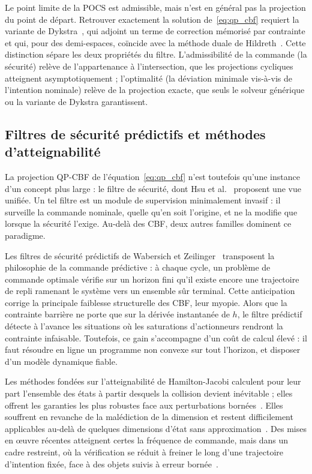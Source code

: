 Le point limite de la \ac{POCS} est admissible, mais n'est en général pas la projection du point de départ. Retrouver exactement la solution de~\eqref{eq:qp_cbf} requiert la variante de Dykstra~\cite{Dykstra1983Restricted,Boyle1986Method}, qui adjoint un terme de correction mémorisé par contrainte et qui, pour des demi-espaces, coïncide avec la méthode duale de Hildreth~\cite{Hildreth1957Quadratic}. Cette distinction sépare les deux propriétés du filtre. L'admissibilité de la commande (la sécurité) relève de l'appartenance à l'intersection, que les projections cycliques atteignent asymptotiquement ; l'optimalité (la déviation minimale vis-à-vis de l'intention nominale) relève de la projection exacte, que seuls le solveur générique ou la variante de Dykstra garantissent.

\subsection{Filtres de sécurité prédictifs et méthodes d'atteignabilité}\label{subsec:revue_filtres_securite}
La projection \ac{QP}-\ac{CBF} de l'équation~\eqref{eq:qp_cbf} n'est toutefois qu'une instance d'un concept plus large : le filtre de sécurité, dont Hsu et al.~\cite{Hsu2024Safety} proposent une vue unifiée. Un tel filtre est un module de supervision minimalement invasif : il surveille la commande nominale, quelle qu'en soit l'origine, et ne la modifie que lorsque la sécurité l'exige. Au-delà des \ac{CBF}, deux autres familles dominent ce paradigme.

Les filtres de sécurité prédictifs de Wabersich et Zeilinger~\cite{Wabersich2021Predictive} transposent la philosophie de la commande prédictive : à chaque cycle, un problème de commande optimale vérifie sur un horizon fini qu'il existe encore une trajectoire de repli ramenant le système vers un ensemble sûr terminal. Cette anticipation corrige la principale faiblesse structurelle des \ac{CBF}, leur myopie. Alors que la contrainte barrière ne porte que sur la dérivée instantanée de $h$, le filtre prédictif détecte à l'avance les situations où les saturations d'actionneurs rendront la contrainte infaisable. Toutefois, ce gain s'accompagne d'un coût de calcul élevé : il faut résoudre en ligne un programme non convexe sur tout l'horizon, et disposer d'un modèle dynamique fiable.

Les méthodes fondées sur l'atteignabilité de Hamilton-Jacobi calculent pour leur part l'ensemble des états à partir desquels la collision devient inévitable ; elles offrent les garanties les plus robustes face aux perturbations bornées~\cite{Wabersich2023Data}. Elles souffrent en revanche de la malédiction de la dimension et restent difficilement applicables au-delà de quelques dimensions d'état sans approximation~\cite{Wabersich2023Data}. Des mises en œuvre récentes atteignent certes la fréquence de commande, mais dans un cadre restreint, où la vérification se réduit à freiner le long d'une trajectoire d'intention fixée, face à des objets suivis à erreur bornée~\cite{Rmer2026From}.

